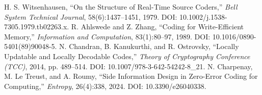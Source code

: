  H. S. Witsenhausen, ``On the Structure of Real-Time Source Coders,'' \emph{Bell System Technical Journal}, 58(6):1437--1451, 1979. DOI: 10.1002/j.1538-7305.1979.tb02263.x.
 R. Ahlswede and Z. Zhang, ``Coding for Write-Efficient Memory,'' \emph{Information and Computation}, 83(1):80--97, 1989. DOI: 10.1016/0890-5401(89)90048-5.
 N. Chandran, B. Kanukurthi, and R. Ostrovsky, ``Locally Updatable and Locally Decodable Codes,'' \emph{Theory of Cryptography Conference (TCC)}, 2014, pp. 489--514. DOI: 10.1007/978-3-642-54242-8\_21.
 N. Charpenay, M. Le Treust, and A. Roumy, ``Side Information Design in Zero-Error Coding for Computing,'' \emph{Entropy}, 26(4):338, 2024. DOI: 10.3390/e26040338.